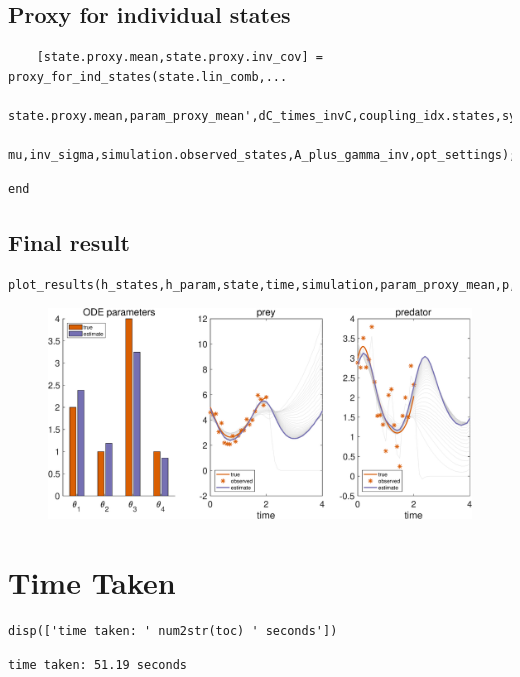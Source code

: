 \subsection{ Proxy for individual states }

\color{RoyalPurple}\begin{verbatim}
    [state.proxy.mean,state.proxy.inv_cov] = proxy_for_ind_states(state.lin_comb,...
        state.proxy.mean,param_proxy_mean',dC_times_invC,coupling_idx.states,symbols,...
        mu,inv_sigma,simulation.observed_states,A_plus_gamma_inv,opt_settings);
\end{verbatim}
\color{black}
\color{RoyalPurple}\begin{verbatim}
end
\end{verbatim}
\color{black}
\begin{par}
\subsection{ Final result }
\end{par} \vspace{1em}
\color{RoyalPurple}\begin{verbatim}
plot_results(h_states,h_param,state,time,simulation,param_proxy_mean,p,symbols,'final');
\end{verbatim}
\color{black}

\begin{figure}[H]
\centering
\includegraphics [width=5in]{Lotka_Volterra_3_45.eps}
\end{figure}

\section{Time Taken}

\color{RoyalPurple}\begin{verbatim}
disp(['time taken: ' num2str(toc) ' seconds'])
\end{verbatim}
\color{black}

        \begin{verbatim}time taken: 51.19 seconds
\end{verbatim}
\color{black} 